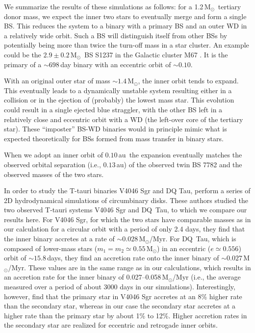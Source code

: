 \documentclass{aastex62}
\newcommand{\MSun}{\mbox{M$_\odot$}}
\begin{document}
We summarize the results of these simulations as follows: for a
1.2\,\MSun\, tertiary donor mass, we expect the inner two stars to
eventually merge and form a single BS. This reduces the
system to a binary with a primary BS and an outer WD in a relatively wide orbit. Such a BS will
distinguish itself from other BSs by potentially
being more than twice the turn-off mass in a star cluster.  An
example could be the $2.9\pm0.2$\,\MSun\, BS S1237 in the
Galactic cluster M67 \cite{2016ApJ...832L..13L}. It is the primary of
a $\sim 698$\,day binary with an eccentric orbit of $\sim 0.10$.

With an original outer star of mass $\sim 1.4$\,\MSun, the inner orbit
tends to expand. This eventually leads
to a dynamically unstable system resulting either in a collision or in
the ejection of (probably) the lowest mass star. This evolution could
result in a single ejected blue straggler, with the other BS left in
a relatively close and eccentric orbit with a WD (the
left-over core of the tertiary star).  These ``imposter'' BS-WD binaries 
would in principle mimic what is expected theoretically for BSs formed 
from mass transfer in binary stars.

When we adopt an inner orbit of $0.10$\,au\, the expansion eventually
matches the observed orbital separation (i.e., $0.13$\,au) of the observed
twin BS 7782 and the observed masses of the two stars.

In order to study the T-tauri binaries V4046 Sgr and DQ Tau,
\cite{2011MNRAS.413.2679D} perform a series of 2D hydrodynamical
simulations of circumbinary disks.  These authors studied the two
observed T-tauri systems V4046 Sgr and DQ~Tau, to which we compare our
results here.  For V4046 Sgr, for which the two stars have comparable
masses as in our calculation for a circular orbit with a period of
only 2.4 days, they find that the inner binary accretes at a rate of
$\sim 0.028$\,\MSun/Myr.  For DQ~Tau, which is composed of lower-mass
stars ($m_1 = m_2 \simeq 0.55$\,\MSun) in an eccentric ($e\simeq
0.556$) orbit of $\sim 15.8$\,days, they find an accretion rate onto
the inner binary of $\sim 0.027$\,\MSun/Myr.  These values are in the
same range as in our calculations, which results in an accretion rate
for the inner binary of 0.027--0.058\,\MSun/Myr (i.e., the average
measured over a period of about 3000 days in our simulations).
Interestingly, however, \cite{2011MNRAS.413.2679D} find that the
primary star in V4046 Sgr accretes at an 8\% higher rate than the
secondary star, whereas in our case the secondary star accretes at a
higher rate than the primary star by about 1\% to 12\%.  Higher
accretion rates in the secondary star are realized for eccentric and
retrogade inner orbits.
\end{document}
